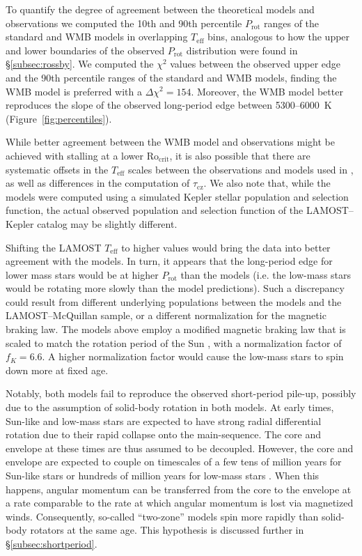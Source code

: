 \documentclass[linenumbers,tighten,trackchanges,twocolumn]{aastex631}
\newcommand{\taucz}{$\tau_\mathrm{cz}$\xspace}
\newcommand{\rocrit}{$\mathrm{Ro_{crit}}$\xspace}
\newcommand{\lamostmcq}{LAMOST--McQuillan\xspace}
\newcommand{\teff}{\ensuremath{T_{\mathrm{eff}}}\xspace}
\newcommand{\prot}{\ensuremath{P_\mathrm{rot}}\xspace}
\begin{document}
To quantify the degree of agreement between the theoretical models and observations we computed the 10th and 90th percentile \prot ranges of the standard and WMB models in overlapping \teff bins, analogous to how the upper and lower boundaries of the observed \prot distribution were found in \S\ref{subsec:rossby}. We computed the $\chi^2$ values between the observed upper edge and the 90th percentile ranges of the standard and WMB models, finding the WMB model is preferred with a $\Delta \chi^2 = 154$. Moreover, the WMB model better reproduces the slope of the observed long-period edge between 5300--6000~K (Figure~\ref{fig:percentiles}). 

While better agreement between the WMB model and observations might be achieved with stalling at a lower \rocrit, it is also possible that there are systematic offsets in the \teff scales between the observations and models used in \citet{vanSaders2019}, as well as differences in the computation of \taucz.  We also note that, while the models were computed using a simulated Kepler stellar population and selection function, the actual observed population and selection function of the LAMOST--Kepler catalog may be slightly different. 

Shifting the LAMOST \teff to higher values would bring the data into better agreement with the models. In turn, it appears that the long-period edge for lower mass stars would be at higher \prot than the models (i.e. the low-mass stars would be rotating more slowly than the model predictions). Such a discrepancy could result from different underlying populations between the models and the \lamostmcq sample, or a different normalization for the magnetic braking law. The models above employ a modified magnetic braking law that is scaled to match the rotation period of the Sun \citep[see equations 1 \& 2 of][]{vanSaders2013}, with a normalization factor of $f_K = 6.6$. A higher normalization factor would cause the low-mass stars to spin down more at fixed age.

Notably, both models fail to reproduce the observed short-period pile-up, possibly due to the assumption of solid-body rotation in both models. At early times, Sun-like and low-mass stars are expected to have strong radial differential rotation due to their rapid collapse onto the main-sequence. The core and envelope at these times are thus assumed to be decoupled. However, the core and envelope are expected to couple on timescales of a few tens of million years for Sun-like stars \citep{Denissenkov2010, GalletBouvier2015, Lanzafame2015} or hundreds of million years for low-mass stars \citep{GalletBouvier2015,Lanzafame2015,Somers2016}. When this happens, angular momentum can be transferred from the core to the envelope at a rate comparable to the rate at which angular momentum is lost via magnetized winds. Consequently, so-called ``two-zone'' models \citep{MacGregor1991} spin more rapidly than solid-body rotators at the same age. This hypothesis is discussed further in \S\ref{subsec:shortperiod}.
\end{document}
